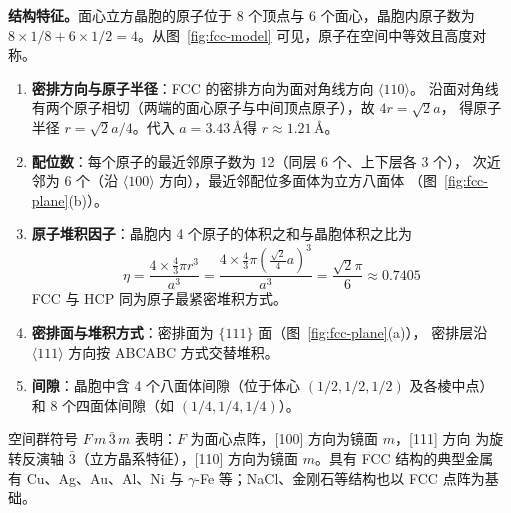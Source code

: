 \textbf{结构特征。}面心立方晶胞的原子位于 8 个顶点与 6 个面心，晶胞内原子数为
$8\times1/8+6\times1/2=4$。从图~\ref{fig:fcc-model} 可见，原子在空间中等效且高度对称。

\begin{enumerate}[label=（\arabic*）]
  \item \textbf{密排方向与原子半径}：FCC 的密排方向为面对角线方向 $\langle110\rangle$。
    沿面对角线有两个原子相切（两端的面心原子与中间顶点原子），故 $4r=\sqrt{2}a$，
    得原子半径 $r=\sqrt{2}a/4$。代入 $a=3.43$\,\AA 得 $r\approx1.21$\,\AA。
  \item \textbf{配位数}：每个原子的最近邻原子数为 12（同层 6 个、上下层各 3 个），
    次近邻为 6 个（沿 $\langle100\rangle$ 方向），最近邻配位多面体为立方八面体
    （图~\ref{fig:fcc-plane}(b)）。
  \item \textbf{原子堆积因子}：晶胞内 4 个原子的体积之和与晶胞体积之比为
    \begin{equation}
      \eta=\frac{4\times\frac{4}{3}\pi r^3}{a^3}
        =\frac{4\times\frac{4}{3}\pi\left(\frac{\sqrt{2}}{4}a\right)^3}{a^3}
        =\frac{\sqrt{2}\pi}{6}\approx0.7405
    \end{equation}
    FCC 与 HCP 同为原子最紧密堆积方式。
  \item \textbf{密排面与堆积方式}：密排面为 $\{111\}$ 面（图~\ref{fig:fcc-plane}(a)），
    密排层沿 $\langle111\rangle$ 方向按 ABCABC 方式交替堆积。
  \item \textbf{间隙}：晶胞中含 4 个八面体间隙（位于体心 $(1/2,1/2,1/2)$ 及各棱中点）
    和 8 个四面体间隙（如 $(1/4,1/4,1/4)$）。
\end{enumerate}

空间群符号 $F\,m\,\bar3\,m$ 表明：$F$ 为面心点阵，[100] 方向为镜面 $m$，[111] 方向
为旋转反演轴 $\bar3$（立方晶系特征），[110] 方向为镜面 $m$。具有 FCC 结构的典型金属
有 Cu、Ag、Au、Al、Ni 与 $\gamma$-Fe 等；NaCl、金刚石等结构也以 FCC 点阵为基础。
